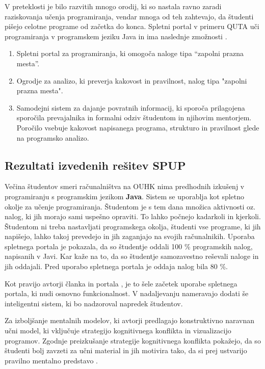 V preteklosti je bilo razvitih mnogo orodij, ki so nastala ravno zaradi
raziskovanja učenja programiranja, vendar mnoga od teh zahtevajo, da
študenti pišejo celotne programe od začetka do konca. Spletni portal
v primeru QUTA uči programiranja v programskem jeziku Java in ima
 naslednje zmožnosti \cite{thesisAWebP}.

\begin{enumerate}
\tightlist
\item Spletni portal za programiranja, ki omogoča naloge tipa ``zapolni
   prazna mesta''. %
\item Ogrodje za analizo, ki preverja kakovost in pravilnost, nalog
   tipa "zapolni prazna mesta".
\item  Samodejni sistem za dajanje povratnih informacij, ki sporoča
   prilagojena sporočila prevajalnika in formalni odziv študentom in
   njihovim mentorjem. Poročilo vsebuje kakovost napisanega programa,
   strukturo in pravilnost glede na programsko analizo.
\end{enumerate}

\subsection{Rezultati izvedenih rešitev SPUP}
\label{sec:rezultati_izvedenih_rešitev}

Večina študentov smeri računalništva na OUHK nima predhodnih izkušenj
v programiranju s programskim jezikom \textbf{Java}. Sistem se
uporablja kot spletno okolje za učenje programiranja. Študentom je s
tem dana množica aktivnosti oz. nalog, ki jih morajo sami uspešno
opraviti. To lahko počnejo kadarkoli in kjerkoli. Študentom ni
treba nastavljati programskega okolja, študenti vse programe, ki
jih napišejo, lahko takoj prevedejo in jih zaganjajo na svojih
računalnikih. Uporaba spletnega portala je pokazala, da so študentje
oddali 100 \% programskih nalog, napisanih v Javi. Kar kaže na to, da so
študentje samozavestno reševali naloge in jih oddajali. Pred uporabo
spletnega portala je oddaja nalog bila 80 \%.

Kot pravijo avtorji članka in portala \cite{ITaLCP_DistanceEdu}, je to
šele začetek uporabe spletnega portala, ki nudi osnovno
funkcionalnost. V nadaljevanju nameravajo dodati še inteligentni
sistem, ki bo nadzoroval napredek študentov.

Za izboljšanje mentalnih modelov, ki avtorji predlagajo konstruktivno
naravnan učni model, ki vključuje strategijo kognitivnega konflikta in
vizualizacijo programov. Zgodnje preizkušanje strategije kognitivnega
konflikta pokažejo, da so študenti bolj zavzeti za učni material in jih
motivira tako, da si prej ustvarijo pravilno mentalno predstavo
\cite{mentalModels}.

